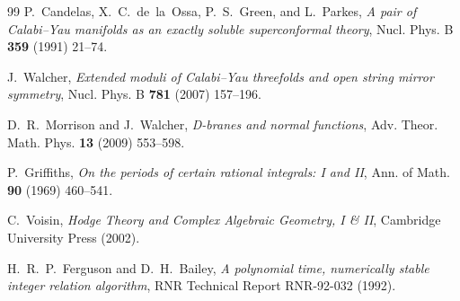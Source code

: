 \documentclass[11pt,a4paper]{article}
\theoremstyle{definition}
\begin{document}
\begin{thebibliography}{99}
P.~Candelas, X.~C.~de~la~Ossa, P.~S.~Green, and L.~Parkes,
\emph{A pair of Calabi--Yau manifolds as an exactly soluble superconformal theory},
Nucl. Phys. B \textbf{359} (1991) 21--74.

J.~Walcher,
\emph{Extended moduli of Calabi--Yau threefolds and open string mirror symmetry},
Nucl. Phys. B \textbf{781} (2007) 157--196.

D.~R.~Morrison and J.~Walcher,
\emph{D-branes and normal functions},
Adv. Theor. Math. Phys. \textbf{13} (2009) 553--598.

P.~Griffiths,
\emph{On the periods of certain rational integrals: I and II},
Ann. of Math. \textbf{90} (1969) 460--541.

C.~Voisin,
\emph{Hodge Theory and Complex Algebraic Geometry, I \& II},
Cambridge University Press (2002).

H.~R.~P.~Ferguson and D.~H.~Bailey,
\emph{A polynomial time, numerically stable integer relation algorithm},
RNR Technical Report RNR-92-032 (1992).

\end{thebibliography}
\end{document}
